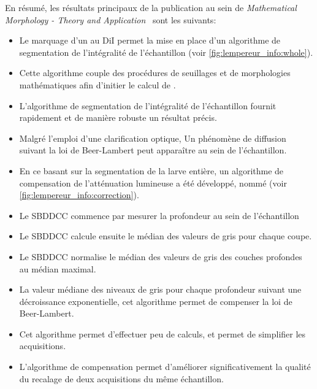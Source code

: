 \documentclass[\main/main.tex]{subfiles}
\begin{document}
En résumé, les résultats principaux de la publication au sein de
\emph{Mathematical Morphology - Theory and Application}~\cite{lempereur_2020} sont les suivants:
\begin{itemize}
    \item 
    Le marquage d'un \pz{} au DiI permet la mise en place
    d'un algorithme de segmentation de l'intégralité de l'échantillon  (voir \autoref{fig:lempereur_info:whole}).
    
    \item
    Cette algorithme couple des procédures de seuillages et de morphologies mathématiques 
    afin d'initier le calcul de \watersheds.
    
    \item
    L'algorithme de segmentation de l'intégralité de l'échantillon fournit
    rapidement et de manière robuste un résultat précis.
    
    \item
    Malgré l'emploi d'une clarification optique,
    Un phénomène de diffusion suivant la loi de Beer-Lambert peut apparaître au sein de l'échantillon.
    
    \item
    En ce basant sur la segmentation de la larve entière,
    un algorithme de compensation de l'atténuation lumineuse a été développé, nommé \sbddcc 
    (voir \autoref{fig:lempereur_info:correction}).
    
    \item
    Le SBDDCC commence par mesurer la profondeur au sein de l'échantillon
    
    \item
    Le SBDDCC calcule ensuite le médian des valeurs de gris pour chaque coupe.
    
    \item
    Le SBDDCC normalise le médian des valeurs de gris des couches profondes au médian maximal.
    
    \item
    La valeur médiane des niveaux de gris pour chaque profondeur suivant une décroissance exponentielle,
    cet algorithme permet de compenser la loi de Beer-Lambert.
    
    \item
    Cet algorithme permet d'effectuer peu de calculs, et permet de simplifier les acquisitions.
    
    \item
    L'algorithme de compensation permet d'améliorer significativement 
    la qualité du recalage de deux acquisitions du même échantillon.
    

\end{itemize}
\end{document}
